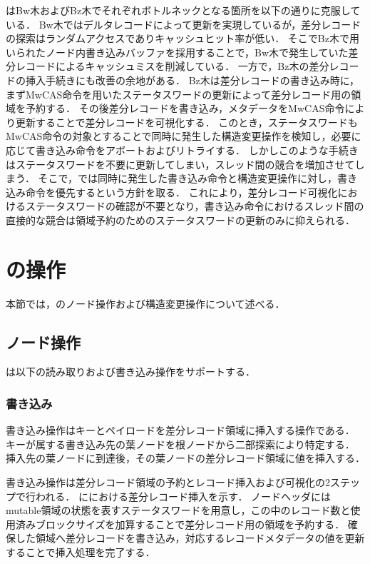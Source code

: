 \Bctree{}はBw木およびBz木でそれぞれボトルネックとなる箇所を以下の通りに克服している．
Bw木ではデルタレコードによって更新を実現しているが，差分レコードの探索はランダムアクセスでありキャッシュヒット率が低い．
そこでBz木で用いられたノード内書き込みバッファを採用することで，Bw木で発生していた差分レコードによるキャッシュミスを削減している．
一方で，Bz木の差分レコードの挿入手続きにも改善の余地がある．
Bz木は差分レコードの書き込み時に，まずMwCAS命令を用いたステータスワードの更新によって差分レコード用の領域を予約する．
その後差分レコードを書き込み，メタデータをMwCAS命令により更新することで差分レコードを可視化する．
このとき，ステータスワードもMwCAS命令の対象とすることで同時に発生した構造変更操作を検知し，必要に応じて書き込み命令をアボートおよびリトライする．
しかしこのような手続きはステータスワードを不要に更新してしまい，スレッド間の競合を増加させてしまう．
そこで，\Bctree{}では同時に発生した書き込み命令と構造変更操作に対し，書き込み命令を優先するという方針を取る．
これにより，差分レコード可視化におけるステータスワードの確認が不要となり，書き込み命令におけるスレッド間の直接的な競合は領域予約のためのステータスワードの更新のみに抑えられる．

\section{\Bctree{}の操作}
\label{sec:bc_tree_operation}

本節では，\Bctree{}のノード操作および構造変更操作について述べる．

\subsection{ノード操作}

\Bctree{}は以下の読み取りおよび書き込み操作をサポートする．

\subsubsection{書き込み}

書き込み操作はキーとペイロードを差分レコード領域に挿入する操作である．
キーが属する書き込み先の葉ノードを根ノードから二部探索により特定する．
挿入先の葉ノードに到達後，その葉ノードの差分レコード領域に値を挿入する．

書き込み操作は差分レコード領域の予約とレコード挿入および可視化の2ステップで行われる．
\Fig{\ref{fig:bc_tree_insertion}}に\Bctree{}における差分レコード挿入を示す．
ノードヘッダにはmutable領域の状態を表すステータスワードを用意し，この中のレコード数と使用済みブロックサイズを加算することで差分レコード用の領域を予約する．
確保した領域へ差分レコードを書き込み，対応するレコードメタデータの値を更新することで挿入処理を完了する．

